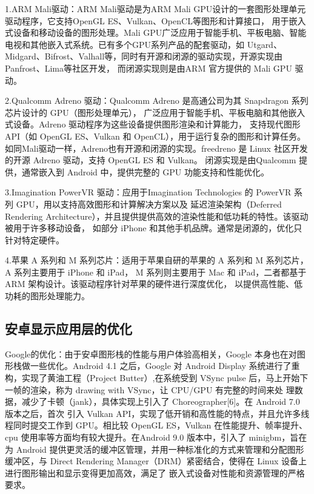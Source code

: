 1.ARM Mali驱动：ARM Mali驱动是为ARM Mali GPU设计的一套图形处理单元驱动程序，它支持OpenGL ES、Vulkan、OpenCL等图形和计算接口，
用于嵌入式设备和移动设备的图形处理。Mali GPU广泛应用于智能手机、平板电脑、智能电视和其他嵌入式系统。已有多个GPU系列产品的配套驱动，如
Utgard、Midgard、Bifrost、Valhall等，同时有开源和闭源的驱动实现，开源实现由Panfrost、Lima等社区开发，
而闭源实现则是由ARM 官方提供的 Mali GPU 驱动。

2.Qualcomm Adreno 驱动：Qualcomm Adreno 是高通公司为其 Snapdragon 系列芯片设计的 GPU（图形处理单元），
广泛应用于智能手机、平板电脑和其他嵌入式设备。Adreno 驱动程序为这些设备提供图形渲染和计算能力，
支持现代图形 API（如 OpenGL ES、Vulkan 和 OpenCL），用于运行复杂的图形和计算任务。
如同Mali驱动一样，Adreno也有开源和闭源的实现。freedreno 是 Linux 社区开发的开源 Adreno 驱动，支持 OpenGL ES 和 Vulkan。
闭源实现是由Qualcomm 提供，通常嵌入到 Android 中，提供完整的 GPU 功能支持和性能优化。

3.Imagination PowerVR 驱动：应用于Imagination Technologies 的 PowerVR 系列 GPU，用以支持高效图形和计算解决方案以及
延迟渲染架构（Deferred Rendering Architecture），并且提供提供高效的渲染性能和低功耗的特性。该驱动被用于许多移动设备，
如部分 iPhone 和其他手机品牌。通常是闭源的，优化只针对特定硬件。

4.苹果 A 系列和 M 系列芯片：适用于苹果自研的苹果的 A 系列和 M 系列芯片，A 系列主要用于 iPhone 和 iPad，
M 系列则主要用于 Mac 和 iPad，二者都基于 ARM 架构设计。该驱动程序针对苹果的硬件进行深度优化，
以提供高性能、低功耗的图形处理能力。




\subsection{安卓显示应用层的优化}
Google的优化：由于安卓图形栈的性能与用户体验高相关，Google 本身也在对图形栈做一些优化。Android 4.1
之后，Google 对 Android Display 系统进行了重构，实现了黄油工程（Project Butter）,在系统受到
VSync pulse 后，马上开始下一帧的渲染，称为 drawing with VSync，让 CPU/GPU 有完整的时间来处
理数据，减少了卡顿（jank），具体实现上引入了 Choreographer[6]。在 Android 7.0 版本之后，首次
引入 Vulkan API，实现了低开销和高性能的特点，并且允许多线程同时提交工作到 GPU。相比较
OpenGL ES，Vulkan 在性能提升、帧率提升、cpu 使用率等方面均有较大提升。在Android 9.0 版本中，引入了
minigbm，旨在为 Android 提供更灵活的缓冲区管理，并用一种标准化的方式来管理和分配图形缓冲区，与 
Direct Rendering Manager（DRM）紧密结合，使得在 Linux 设备上进行图形输出和显示变得更加高效，满足了
嵌入式设备对性能和资源管理的严格要求。

